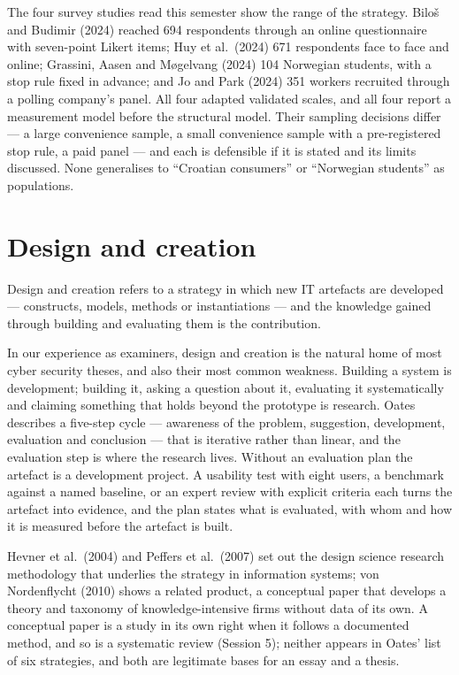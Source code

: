 \documentclass[11pt,a4paper,british,twoside=false,headings=small,chapterprefix=false,numbers=noenddot]{scrbook}
\newenvironment{block}[1]{\begin{tcolorbox}[scriptbox, title={#1}]}{\end{tcolorbox}}
\begin{document}
The four survey studies read this semester show the range of the strategy. Biloš and Budimir (2024) reached 694 respondents through an online questionnaire with seven-point Likert items; Huy et al.\ (2024) 671 respondents face to face and online; Grassini, Aasen and Møgelvang (2024) 104 Norwegian students, with a stop rule fixed in advance; and Jo and Park (2024) 351 workers recruited through a polling company's panel. All four adapted validated scales, and all four report a measurement model before the structural model. Their sampling decisions differ --- a large convenience sample, a small convenience sample with a pre-registered stop rule, a paid panel --- and each is defensible if it is stated and its limits discussed. None generalises to ``Croatian consumers'' or ``Norwegian students'' as populations.

\section{Design and creation}

\begin{block}{Design and creation}
Design and creation refers to a strategy in which new IT artefacts are developed --- constructs, models, methods or instantiations --- and the knowledge gained through building and evaluating them is the contribution.
\end{block}

In our experience as examiners, design and creation is the natural home of most cyber security theses, and also their most common weakness. Building a system is development; building it, asking a question about it, evaluating it systematically and claiming something that holds beyond the prototype is research. Oates describes a five-step cycle --- awareness of the problem, suggestion, development, evaluation and conclusion --- that is iterative rather than linear, and the evaluation step is where the research lives. Without an evaluation plan the artefact is a development project. A usability test with eight users, a benchmark against a named baseline, or an expert review with explicit criteria each turns the artefact into evidence, and the plan states what is evaluated, with whom and how it is measured before the artefact is built.

Hevner et al.\ (2004) and Peffers et al.\ (2007) set out the design science research methodology that underlies the strategy in information systems; von Nordenflycht (2010) shows a related product, a conceptual paper that develops a theory and taxonomy of knowledge-intensive firms without data of its own. A conceptual paper is a study in its own right when it follows a documented method, and so is a systematic review (Session 5); neither appears in Oates' list of six strategies, and both are legitimate bases for an essay and a thesis.
\end{document}
